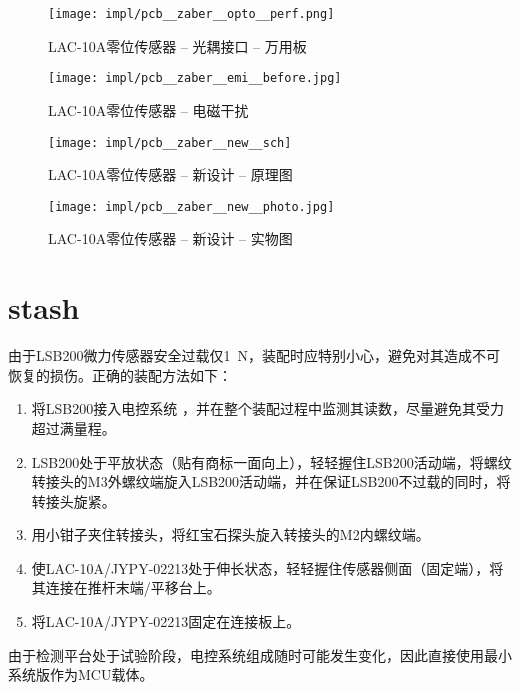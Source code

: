 \begin{figure}[tbhp]
\centering
\texttt{[image: impl/pcb\_\_zaber\_\_opto\_\_perf.png]}
\caption{LAC-10A零位传感器 -- 光耦接口 -- 万用板}
\label{fig:impl-pcb-zaber-opto-perf}
\end{figure}

\begin{figure}[tbhp]
\centering
\texttt{[image: impl/pcb\_\_zaber\_\_emi\_\_before.jpg]}
\caption{LAC-10A零位传感器 -- 电磁干扰}
\label{fig:impl-pcb-zaber-emi-before}
\end{figure}

\begin{figure}[p]
\centering
\texttt{[image: impl/pcb\_\_zaber\_\_new\_\_sch]}
\caption{LAC-10A零位传感器 -- 新设计 -- 原理图}
\label{fig:impl-pcb-zaber-new-sch}
\end{figure}

\begin{figure}[p]
\centering
\texttt{[image: impl/pcb\_\_zaber\_\_new\_\_photo.jpg]}
\caption{LAC-10A零位传感器 -- 新设计 -- 实物图}
\label{fig:impl-pcb-zaber-new-photo}
\end{figure}








\clearpage



\section{stash}

由于LSB200微力传感器安全过载仅\SI{1}{\newton}，装配时应特别小心，避免对其造成不可恢复的损伤。正确的装配方法如下：

\begin{enumerate}
  \item
    将LSB200接入电控系统
    ，并在整个装配过程中监测其读数，尽量避免其受力超过满量程。
  \item
    LSB200处于平放状态（贴有商标一面向上），轻轻握住LSB200活动端，将螺纹转接头的M3外螺纹端旋入LSB200活动端，并在保证LSB200不过载的同时，将转接头旋紧。
  \item
    用小钳子夹住转接头，将红宝石探头旋入转接头的M2内螺纹端。
  \item
    使LAC-10A/JYPY-02213处于伸长状态，轻轻握住传感器侧面（固定端），将其连接在推杆末端/平移台上。
  \item
    将LAC-10A/JYPY-02213固定在连接板上。
\end{enumerate}


由于检测平台处于试验阶段，电控系统组成随时可能发生变化，因此直接使用最小系统版作为MCU载体。